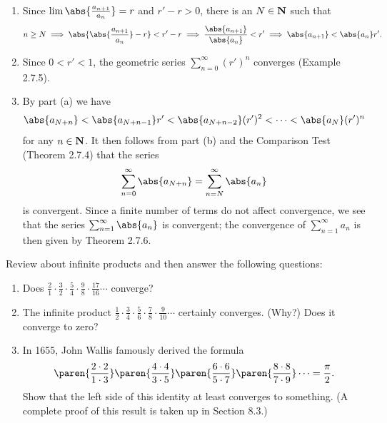 \documentclass{lew98_solutions}
\begin{document}
\begin{solution}
    \begin{enumerate}
        \item Since \( \lim \abs{\frac{a_{n+1}}{a_n}} = r \) and \( r' - r > 0 \), there is an \( N \in \mathbf{N} \) such that
        \[
            n \geq N \implies \abs{\abs{\frac{a_{n+1}}{a_n}} - r} < r' - r \implies \frac{\abs{a_{n+1}}}{\abs{a_n}} < r' \implies \abs{a_{n+1}} < \abs{a_n} r'.
        \]

        \item Since \( 0 < r' < 1 \), the geometric series \( \sum_{n=0}^{\infty} (r')^n \) converges (Example 2.7.5).

        \item By part (a) we have
        \[
            \abs{a_{N+n}} < \abs{a_{N+n-1}} r' < \abs{a_{N+n-2}} (r')^2 < \cdots < \abs{a_N} (r')^n
        \]
        for any \( n \in \mathbf{N} \). It then follows from part (b) and the Comparison Test (Theorem 2.7.4) that the series
        \[
            \sum_{n=0}^{\infty} \abs{a_{N+n}} = \sum_{n=N}^{\infty} \abs{a_n}
        \]
        is convergent. Since a finite number of terms do not affect convergence, we see that the series \( \sum_{n=1}^{\infty} \abs{a_n} \) is convergent; the convergence of \( \sum_{n=1}^{\infty} a_n \) is then given by Theorem 2.7.6.
    \end{enumerate}
\end{solution}

\begin{exercise}
\label{ex:2.7.10}
    Review  about infinite products and then answer the following questions:
    \begin{enumerate}
        \item Does \( \tfrac{2}{1} \cdot \tfrac{3}{2} \cdot \tfrac{5}{4} \cdot \tfrac{9}{8} \cdot \tfrac{17}{16} \cdots \) converge?

        \item The infinite product \( \tfrac{1}{2} \cdot \tfrac{3}{4} \cdot \tfrac{5}{6} \cdot \tfrac{7}{8} \cdot \tfrac{9}{10} \cdots \) certainly converges. (Why?) Does it converge to zero?

        \item In 1655, John Wallis famously derived the formula
        \[
            \paren{ \frac{2 \cdot 2}{1 \cdot 3} } \paren{ \frac{4 \cdot 4}{3 \cdot 5} } \paren{ \frac{6 \cdot 6}{5 \cdot 7} } \paren{ \frac{8 \cdot 8}{7 \cdot 9} } \cdots = \frac{\pi}{2}.
        \]
        Show that the left side of this identity at least converges to something. (A complete proof of this result is taken up in Section 8.3.)
    \end{enumerate}
\end{exercise}
\end{document}
